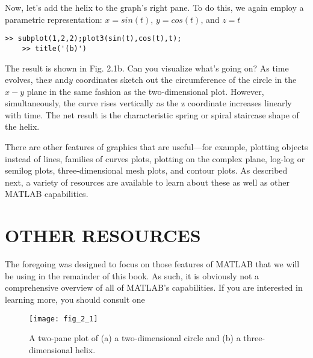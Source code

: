 \documentclass[../main.tex]{subfiles}
\begin{document}
Now, let's add the helix to the graph's right pane. To do this, we again employ a parametric representation:
 $x = sin(t)$, $y = cos(t)$, and $z = t$
 \begin{lstlisting}[frame=none, numbers=none]
	>> subplot(1,2,2);plot3(sin(t),cos(t),t);
	>> title('(b)')
\end{lstlisting}
The result is shown in Fig. 2.1b. Can you visualize what's going on? As time evolves,
the$ x$ and$ y$ coordinates sketch out the circumference of the circle in the $x-y$ plane in the
same fashion as the two-dimensional plot. However, simultaneously, the curve rises vertically as the z coordinate 
increases linearly with time. The net result is the characteristic
spring or spiral staircase shape of the helix.


There are other features of graphics that are useful—for example, plotting objects
instead of lines, families of curves plots, plotting on the complex plane, log-log or semilog
plots, three-dimensional mesh plots, and contour plots. As described next, a variety of resources are available
 to learn about these as well as other MATLAB capabilities.


\section{OTHER RESOURCES}


The foregoing was designed to focus on those features of MATLAB that we will be using
in the remainder of this book. As such, it is obviously not a comprehensive overview of all
of MATLAB's capabilities. If you are interested in learning more, you should consult one


\begin{figure}[H]
	\centering
	\texttt{[image: fig\_2\_1]}
   \caption{\textsf{A two-pane plot of (a) a two-dimensional circle and (b) a three-dimensional helix. }}
   \label{fig_2_1}
\end{figure}
\end{document}
